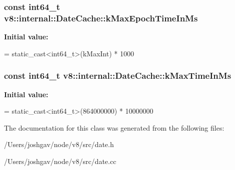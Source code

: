 \subsubsection[{\texorpdfstring{k\+Max\+Epoch\+Time\+In\+Ms}{kMaxEpochTimeInMs}}]{\setlength{\rightskip}{0pt plus 5cm}const int64\+\_\+t v8\+::internal\+::\+Date\+Cache\+::k\+Max\+Epoch\+Time\+In\+Ms\hspace{0.3cm}{\ttfamily [static]}}\hypertarget{classv8_1_1internal_1_1_date_cache_a86951568799478d24f7a082a282fb950}{}\label{classv8_1_1internal_1_1_date_cache_a86951568799478d24f7a082a282fb950}
{\bfseries Initial value\+:}
\begin{DoxyCode}
=
      \textcolor{keyword}{static\_cast<}int64\_t\textcolor{keyword}{>}(kMaxInt) * 1000
\end{DoxyCode}
\subsubsection[{\texorpdfstring{k\+Max\+Time\+In\+Ms}{kMaxTimeInMs}}]{\setlength{\rightskip}{0pt plus 5cm}const int64\+\_\+t v8\+::internal\+::\+Date\+Cache\+::k\+Max\+Time\+In\+Ms\hspace{0.3cm}{\ttfamily [static]}}\hypertarget{classv8_1_1internal_1_1_date_cache_a9b5d4e427df84cc594d6a541f9ea309e}{}\label{classv8_1_1internal_1_1_date_cache_a9b5d4e427df84cc594d6a541f9ea309e}
{\bfseries Initial value\+:}
\begin{DoxyCode}
=
      \textcolor{keyword}{static\_cast<}int64\_t\textcolor{keyword}{>}(864000000) * 10000000
\end{DoxyCode}


The documentation for this class was generated from the following files\+:\begin{DoxyCompactItemize}
\item 
/\+Users/joshgav/node/v8/src/date.\+h\item 
/\+Users/joshgav/node/v8/src/date.\+cc\end{DoxyCompactItemize}
